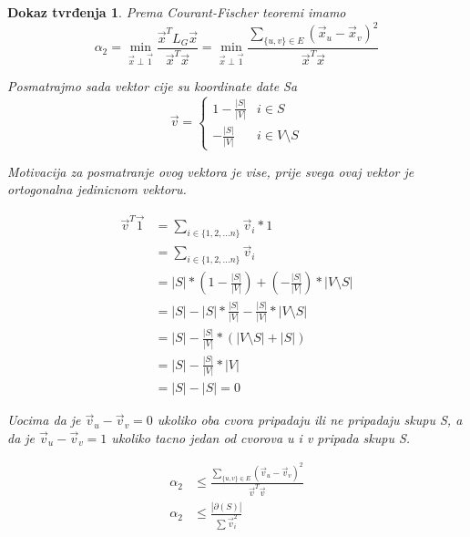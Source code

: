 \documentclass[11pt]{article}
\newtheorem*{custom_proof}{Dokaz tvrđenja}
\begin{document}
    \begin{custom_proof}
        Prema Courant-Fischer teoremi imamo
        \[
        \alpha_2 = \min_{\vec{x} \perp \vec{1}} \frac{\vec{x}^T L_G \vec{x}}{\vec{x}^T \vec{x}} 
        = \min_{\vec{x} \perp \vec{1}} \frac{ \sum_{\{u,v\} \in E} (\vec{x}_u - \vec{x}_v)^2}{\vec{x}^T \vec{x}}
        \]

        Posmatrajmo sada vektor cije su koordinate date Sa
        \[
            \vec{v} = 
            \begin{cases}
                1 - \frac{|S|}{|V|} & i \in S\\ 
                - \frac{|S|}{|V|} & i \in V \setminus S
            \end{cases}
        \]

        Motivacija za posmatranje ovog vektora je vise, prije svega ovaj vektor je ortogonalna jedinicnom vektoru.

        \[
        \begin{split}
            \vec{v}^T\vec{1} & = \sum_{i \in \{1,2, \dots n\}} \vec{v}_i * 1 \\
            & = \sum_{i \in \{1,2, \dots n\}} \vec{v}_i \\
            & = |S| * (  1 - \frac{|S|}{|V|} ) + ( -\frac{|S|}{|V|}) * |V \setminus S| \\
            & = |S| - |S| * \frac{|S|}{|V|} - \frac{|S|}{|V|} * |V \setminus S| \\
            & = |S| - \frac{|S|}{|V|} * (|V \setminus S| + |S|) \\
            & = |S| - \frac{|S|}{|V|} * |V| \\
            & = |S| - |S| = 0 
        \end{split}
        \]

        Uocima da je $\vec{v}_u - \vec{v}_v = 0$ ukoliko oba cvora pripadaju ili ne pripadaju skupu S, a da je $\vec{v}_u - \vec{v}_v = 1$ ukoliko tacno jedan od cvorova u i v pripada skupu S.
         
        \[
        \begin{split}
            \alpha_2  & \leq \frac{ \sum_{\{u,v\} \in E} (\vec{v}_u - \vec{v}_v)^2}{\vec{v}^T \vec{v}} \\
            \alpha_2  & \leq \frac{ |\partial(S)|}{\sum \vec{v}_i^2} 
        \end{split}
        \]
        

\end{custom_proof}
\end{document}
